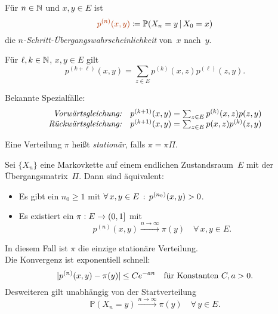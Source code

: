 \documentclass{cheat-sheet}
\renewcommand{\P}{\mathbb{P}} %
\newcommand{\Defn}[1]{\textcolor{DefinitionColor}{#1}}
\begin{document}
\begin{defn}
  Für $n \in \mathbb{N}$ und $x, y \in E$ ist
  \[
    \Defn{p^{(n)}(x, y)} \coloneqq \P(X_n=y \,|\, X_0=x)
  \]
  die \emph{$n$-Schritt-Übergangswahrscheinlichkeit} von~$x$ nach~$y$.
\end{defn}

\begin{lem}
  Für $\ell, k \in \mathbb{N}$, $x, y \in E$ gilt
  \[
    p^{(k + \ell)}(x, y) = {\sum}_{z \in E} p^{(k)}(x, z) p^{(\ell)}(z, y).
  \]
\end{lem}

\begin{bem}
  Bekannte Spezialfälle:
  \[
    \begin{array}{r l}
      \text{\textit{Vorwärtsgleichung:}} & p^{(k+1)}(x, y) = {\sum}_{z \in E} \, p^{(k)}(x, z) p(z, y) \\
      \text{\textit{Rückwärtsgleichung:}} & p^{(k+1)}(x, y) = {\sum}_{z \in E} \, p(x, z) p^{(k)}(z, y)
    \end{array}
  \]
\end{bem}




\begin{defn}
  Eine Verteilung $\pi$ heißt \emph{stationär}, falls $\pi = \pi \Pi$.
\end{defn}

\begin{satz}
  Sei $\{ X_n \}$ eine Markovkette auf einem endlichen Zustandsraum~$E$ mit der Übergangsmatrix~$\Pi$.
  Dann sind äquivalent:
  \begin{itemize}
    \item Es gibt ein $n_0 \geq 1$ mit $\forall \, {x, y \in E} \,:\, p^{(n_0)}(x, y) > 0$.
    \item Es existiert ein $\pi : E \to \left( 0, 1 \right]$ mit
    \[
      p^{(n)}(x, y) \xrightarrow{n \to \infty} \pi(y)
      \quad \forall \, x, y \in E.
    \]
  \end{itemize}
  In diesem Fall ist $\pi$ die einzige stationäre Verteilung. \\
  Die Konvergenz ist exponentiell schnell:
  \[
    \lvert p^{(n)}(x, y) - \pi(y)\rvert \leq C e^{- a n} \quad
    \text{für Konstanten $C, a > 0$.}
  \]
  Desweiteren gilt unabhängig von der Startverteilung
  \[
    \P(X_n = y) \xrightarrow{n \to \infty} \pi(y) \quad
    \forall \, y \in E.
  \]
\end{satz}
\end{document}
